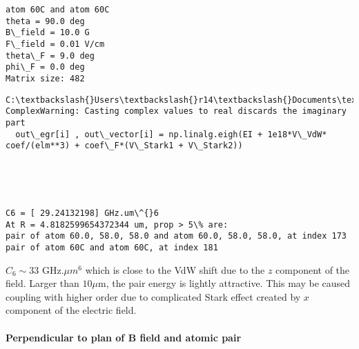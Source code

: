 \documentclass{article}
\begin{document}
    \begin{Verbatim}[commandchars=\\\{\}]
atom 60C and atom 60C
theta = 90.0 deg
B\_field = 10.0 G
F\_field = 0.01 V/cm
theta\_F = 9.0 deg
phi\_F = 0.0 deg
Matrix size: 482
    \end{Verbatim}

    \begin{Verbatim}[commandchars=\\\{\}]
C:\textbackslash{}Users\textbackslash{}r14\textbackslash{}Documents\textbackslash{}GitHub\textbackslash{}test\textbackslash{}python\textbackslash{}cal\_VdW.py:271: ComplexWarning: Casting complex values to real discards the imaginary part
  out\_egr[i] , out\_vector[i] = np.linalg.eigh(EI + 1e18*V\_VdW* coef/(elm**3) + coef\_F*(V\_Stark1 + V\_Stark2))
    \end{Verbatim}

    \begin{center}
    \end{center}
    { \hspace*{\fill} \\}
    
    \begin{center}
    \end{center}
    { \hspace*{\fill} \\}
    
    \begin{Verbatim}[commandchars=\\\{\}]
C6 = [ 29.24132198] GHz.um\^{}6
At R = 4.8182599654372344 um, prop > 5\% are:
pair of atom 60.0, 58.0, 58.0 and atom 60.0, 58.0, 58.0, at index 173
pair of atom 60C and atom 60C, at index 181
    \end{Verbatim}

    \(C_6 \sim 33\) GHz\(.\mu m^6\) which is close to the VdW shift due to
the \(z\) component of the field. Larger than \(10 \mu\)m, the pair
energy is lightly attractive. This may be caused coupling with higher
order due to complicated Stark effect created by \(x\) component of the
electric field.

\paragraph{Perpendicular to plan of B field and atomic
pair}\label{perpendicular-to-plan-of-b-field-and-atomic-pair}
\end{document}
